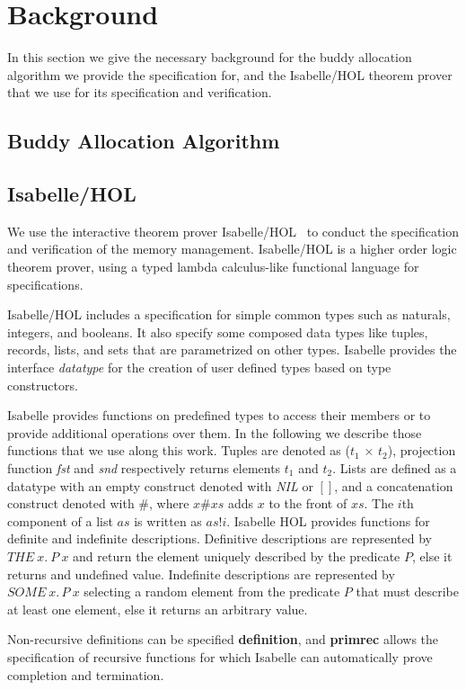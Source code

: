 \section{Background}

In this section we give the necessary background for the buddy allocation algorithm we provide the specification for, and the Isabelle/HOL theorem prover that we use for its specification and verification.

\subsection{Buddy Allocation Algorithm}

\subsection{Isabelle/HOL}
We use the interactive theorem prover Isabelle/HOL~\cite{reg_Isabelle/HOL} to conduct the specification and verification of the memory management. Isabelle/HOL is a higher order logic theorem prover, using a typed lambda calculus-like functional language for specifications. 

Isabelle/HOL includes a specification for simple common types such as naturals, integers, and booleans. It also specify some composed data types like tuples, records, lists, and sets that are parametrized on other types. Isabelle provides the interface \emph{datatype} for the creation of user defined types based on type constructors. 

Isabelle provides functions on predefined types to access their members or to provide additional operations over them. In the following we describe those functions that we use along this work. Tuples are denoted as (\emph{$t_1$} $\times$ \emph{$t_2$}), projection function \emph{fst} and \emph{snd} respectively returns elements $t_1$ and $t_2$. Lists are defined as a datatype with an empty construct denoted with \emph{NIL} or $[]$, and a concatenation construct denoted with $\#$, where $x\#xs$ adds $x$ to the front of $xs$. The $i$th component of a list $as$ is written as $as!i$. Isabelle HOL provides functions for definite and indefinite descriptions. Definitive descriptions are represented by $THE\ x.\ P\ x$ and return the element uniquely described by the predicate $P$, else it returns and undefined value. Indefinite descriptions are represented by $SOME\ x.\, P\ x$ selecting a random element from the predicate $P$ that must describe at least one element, else it returns an arbitrary value.

Non-recursive definitions can be specified \textbf{definition}, and \textbf{primrec} allows the specification of recursive functions for which Isabelle can automatically prove completion and termination. 




